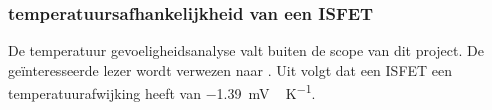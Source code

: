 
\subsubsection{temperatuursafhankelijkheid van een ISFET}
De temperatuur gevoeligheidsanalyse valt buiten de scope van dit project. De geïnteresseerde lezer wordt verwezen naar \cite{isfetAsAnElectronicDevice}. Uit \cite{isfetAsAnElectronicDevice} volgt dat een ISFET een temperatuurafwijking heeft van \qty{-1.39}{\milli\volt\,\kelvin^{-1}}.




